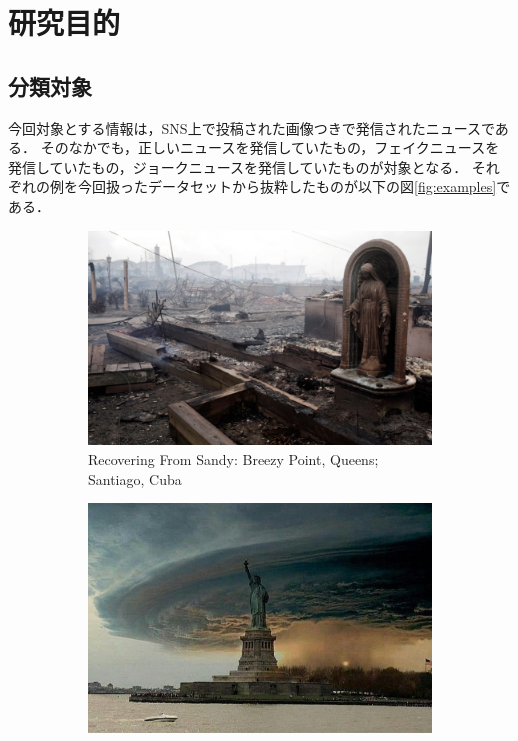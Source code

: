 \chapter{研究目的}
%
\section{分類対象}
今回対象とする情報は，SNS上で投稿された画像つきで発信されたニュースである．
そのなかでも，正しいニュースを発信していたもの，フェイクニュースを発信していたもの，ジョークニュースを発信していたものが対象となる．
それぞれの例を今回扱ったデータセットから抜粋したものが以下の図\ref{fig:examples}である．

\begin{figure}[h]
    \centering
    \begin{subfigure}{0.31\textwidth}
        \includegraphics[width=\linewidth]{images/real_example.jpg}
        \caption{Recovering From Sandy: Breezy Point, Queens; Santiago, Cuba}
        \label{fig:real}
    \end{subfigure}
    \hspace*{\fill} %
    \begin{subfigure}{0.31\textwidth}
        \includegraphics[width=\linewidth]{images/fake_example.jpg}

\end{subfigure}
\end{figure}
